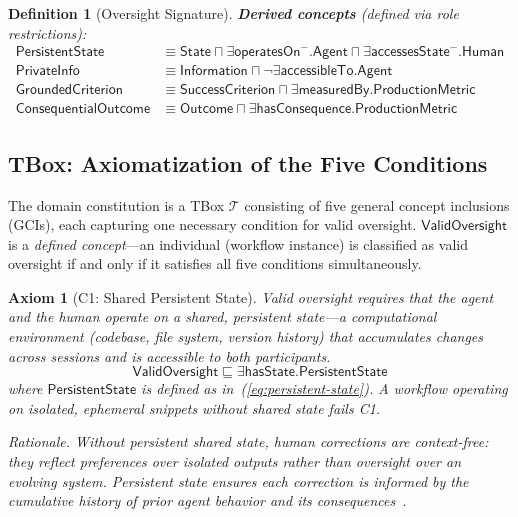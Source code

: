 \documentclass[11pt]{article}
\newtheorem{definition}{Definition}[section]
\newtheorem{axiom}{Axiom}[section]
\newcommand{\TBox}{\ensuremath{\mathcal{T}}\xspace}
\newcommand{\sqsub}{\sqsubseteq}
\begin{document}
\begin{definition}[Oversight Signature]
\medskip\noindent
\textbf{Derived concepts} (defined via role restrictions):
\begin{align}
  \mathsf{PersistentState} &\equiv \mathsf{State} \sqcap
    \exists\mathsf{operatesOn}^{-}.\mathsf{Agent} \sqcap
    \exists\mathsf{accessesState}^{-}.\mathsf{Human}
    \label{eq:persistent-state} \\[4pt]
  \mathsf{PrivateInfo} &\equiv \mathsf{Information} \sqcap
    \neg\exists\mathsf{accessibleTo}.\mathsf{Agent}
    \label{eq:private-info} \\[4pt]
  \mathsf{GroundedCriterion} &\equiv \mathsf{SuccessCriterion} \sqcap
    \exists\mathsf{measuredBy}.\mathsf{ProductionMetric}
    \label{eq:grounded-criterion} \\[4pt]
  \mathsf{ConsequentialOutcome} &\equiv \mathsf{Outcome} \sqcap
    \exists\mathsf{hasConsequence}.\mathsf{ProductionMetric}
    \label{eq:consequential-outcome}
\end{align}
\end{definition}

\subsection{TBox: Axiomatization of the Five Conditions}
\label{sec:tbox}

The domain constitution is a TBox \TBox consisting of five general concept inclusions (GCIs), each capturing one necessary condition for valid oversight.
$\mathsf{ValidOversight}$ is a \emph{defined concept}---an individual (workflow instance) is classified as valid oversight if and only if it satisfies all five conditions simultaneously.

\begin{axiom}[C1: Shared Persistent State]
\label{ax:c1}
Valid oversight requires that the agent and the human operate on a shared, persistent state---a computational environment (codebase, file system, version history) that accumulates changes across sessions and is accessible to both participants.
\begin{equation}
  \mathsf{ValidOversight} \sqsub
    \exists\mathsf{hasState}.\mathsf{PersistentState}
  \label{eq:c1}
\end{equation}
where $\mathsf{PersistentState}$ is defined as in~(\ref{eq:persistent-state}).
A workflow operating on isolated, ephemeral snippets without shared state fails C1.

\medskip\noindent
\emph{Rationale.}
Without persistent shared state, human corrections are context-free: they reflect preferences over isolated outputs rather than oversight over an evolving system.
Persistent state ensures each correction is informed by the cumulative history of prior agent behavior and its consequences~\citep{ovcharov2026edittrace}.
\end{axiom}
\end{document}
